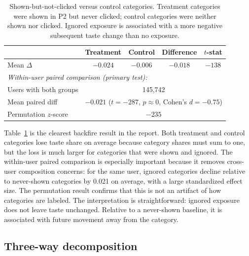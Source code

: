 \documentclass[11pt]{article}
\begin{document}
\begin{table}[ht]
\centering
\caption{Shown-but-not-clicked versus control categories. Treatment categories were shown in P2 but never clicked; control categories were neither shown nor clicked. Ignored exposure is associated with a more negative subsequent taste change than no exposure.}
\label{tab:backfire}
\begin{tabular}{lcccc}
\toprule
 & Treatment & Control & Difference & $t$-stat \\
\midrule
Mean $\Delta$ & $-0.024$ & $-0.006$ & $-0.018$ & $-138$ \\
\midrule
\multicolumn{5}{l}{\textit{Within-user paired comparison (primary test):}} \\
Users with both groups & \multicolumn{4}{c}{145,742} \\
Mean paired diff & \multicolumn{4}{c}{$-0.021$ ($t = -287$, $p \approx 0$, Cohen's $d = -0.75$)} \\
Permutation $z$-score & \multicolumn{4}{c}{$-235$} \\
\bottomrule
\end{tabular}
\end{table}
\FloatBarrier

Table~\ref{tab:backfire} is the clearest backfire result in the report. Both treatment and control categories lose taste share on average because category shares must sum to one, but the loss is much larger for categories that were shown and ignored. The within-user paired comparison is especially important because it removes cross-user composition concerns: for the same user, ignored categories decline relative to never-shown categories by 0.021 on average, with a large standardized effect size. The permutation result confirms that this is not an artifact of how categories are labeled. The interpretation is straightforward: ignored exposure does not leave taste unchanged. Relative to a never-shown baseline, it is associated with future movement away from the category.
\subsection{Three-way decomposition}
\end{document}

